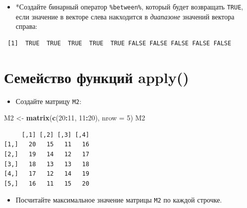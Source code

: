 \documentclass[
]{book}
\newenvironment{Shaded}{\begin{snugshade}}{\end{snugshade}}
\newcommand{\DataTypeTok}[1]{\textcolor[rgb]{0.13,0.29,0.53}{#1}}
\newcommand{\DecValTok}[1]{\textcolor[rgb]{0.00,0.00,0.81}{#1}}
\newcommand{\KeywordTok}[1]{\textcolor[rgb]{0.13,0.29,0.53}{\textbf{#1}}}
\newcommand{\NormalTok}[1]{#1}
\newcommand{\OperatorTok}[1]{\textcolor[rgb]{0.81,0.36,0.00}{\textbf{#1}}}
\newcommand{\StringTok}[1]{\textcolor[rgb]{0.31,0.60,0.02}{#1}}
\providecommand{\tightlist}{%
  \setlength{\itemsep}{0pt}\setlength{\parskip}{0pt}}
\begin{document}
\begin{itemize}
\tightlist
\item
  *Создайте бинарный оператор \texttt{\%between\%}, который будет возвращать \texttt{TRUE}, если значение в векторе слева накходится в \emph{диапазоне} значений вектора справа:
\end{itemize}

\begin{Shaded}
\end{Shaded}

\begin{verbatim}
 [1]  TRUE  TRUE  TRUE  TRUE  TRUE FALSE FALSE FALSE FALSE FALSE
\end{verbatim}

\hypertarget{task_apply}{%
\section{Семейство функций apply()}\label{task_apply}}

\begin{itemize}
\tightlist
\item
  Создайте матрицу \texttt{M2}:
\end{itemize}

\begin{Shaded}
\begin{Highlighting}[]
\NormalTok{M2 <-}\StringTok{ }\KeywordTok{matrix}\NormalTok{(}\KeywordTok{c}\NormalTok{(}\DecValTok{20}\OperatorTok{:}\DecValTok{11}\NormalTok{, }\DecValTok{11}\OperatorTok{:}\DecValTok{20}\NormalTok{), }\DataTypeTok{nrow =} \DecValTok{5}\NormalTok{)}
\NormalTok{M2}
\end{Highlighting}
\end{Shaded}

\begin{verbatim}
     [,1] [,2] [,3] [,4]
[1,]   20   15   11   16
[2,]   19   14   12   17
[3,]   18   13   13   18
[4,]   17   12   14   19
[5,]   16   11   15   20
\end{verbatim}

\begin{itemize}
\tightlist
\item
  Посчитайте максимальное значение матрицы \texttt{M2} по каждой строчке.
\end{itemize}
\end{document}
